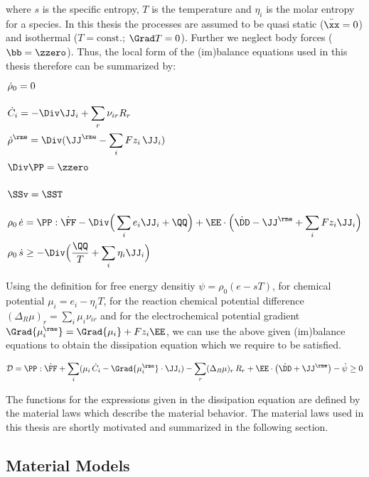 where $s$ is the specific entropy, $T$ is the temperature and $\eta_i$ is the molar entropy for a species. In this thesis the processes are assumed to be quasi static ($\ddot\xx=0$) and isothermal ($T=\text{const.}$; $\Grad T = 0$). Further we neglect body forces ($\bb=\zzero$). Thus, the local form of the (im)balance equations used in this thesis therefore can be summarized by:
\begin{align}
  \vphantom{\sum_i}& \dot\rho_0 = 0 \\
  \vphantom{\sum_i}& \dot C_i = -\Div\JJ_i + \sum_r \nu_{ir} R_r \\
  \vphantom{\sum_i}& \dot \rho^{\rme} = \Div(\JJ^\rme - \sum_i Fz_i\, \JJ_i) \\
  \vphantom{\sum_i}& \Div\PP = \zzero \\
  \vphantom{\sum_i}& \SSv = \SST \\
  \vphantom{\sum_i}& \rho_0\,\dot e = \PP:\dot\FF - \Div\Big(\sum_i e_i \JJ_i+ \QQ \Big)+ \EE\cdot\Big(\dot \DD-\JJ^\rme+\sum_i Fz_i\JJ_i\Big) \\
  \vphantom{\sum_i}& \rho_0\,\dot s \geq -\Div\Big(\frac{\QQ}{T}+\sum_i \eta_i \JJ_i \Big)
\end{align}

Using the definition for free energy densitiy $\psi=\rho_0(e-sT)$, for chemical potential $\mu_i=e_i-\eta_iT$, for the reaction chemical potential difference $(\Delta_R\mu)_r=\sum_i \mu_i\nu_{ir}$ and for the electrochemical potential gradient $\Grad{\mu^\rme_i}=\Grad{\mu_i} + Fz_i\EE$, we can use the above given (im)balance equations to obtain the dissipation equation which we require to be satisfied. 

\begin{align}
  \begin{aligned}
    \mathcal{D} = \PP:\dot\FF + \sum_i (\mu_i\,\dot C_i-\Grad{\mu_i^\rme}\cdot\JJ_i) - \sum_r (\Delta_R\mu)_r \,R_r + \EE\cdot\big(\dot\DD+\JJ^\rme\big)- \dot\psi\geq 0
  \end{aligned}
  \label{eq:dissipation}
\end{align}

The functions for the expressions given in the dissipation equation are defined by the material laws which describe the material behavior. The material laws used in this thesis are shortly motivated and summarized in the following section. 

\subsection{Material Models}

